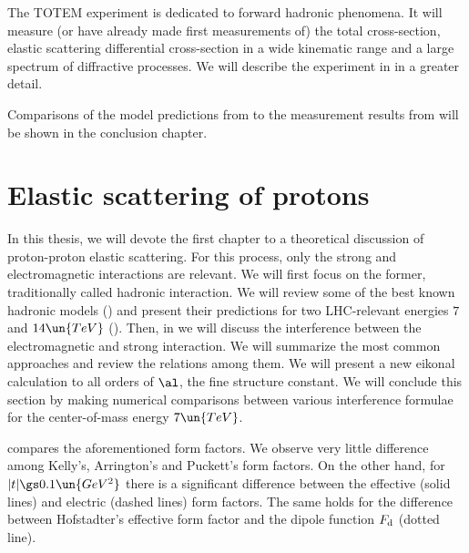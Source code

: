 The TOTEM experiment is dedicated to forward hadronic phenomena. It will measure (or have already made first measurements of) the total cross-section, elastic scattering differential cross-section in a wide kinematic range and a large spectrum of diffractive processes. We will describe the experiment in  in a greater detail.



Comparisons of the model predictions from  to the measurement results from  will be shown in the conclusion chapter.


\chapter[el]{Elastic scattering of protons}

In this thesis, we will devote the first chapter to a theoretical discussion of proton-proton elastic scattering. For this process, only the strong and electromagnetic interactions are relevant. We will first focus on the former, traditionally called hadronic interaction. We will review some of the best known hadronic models () and present their predictions for two LHC-relevant energies $7$ and $14\un{TeV}$ (). Then, in  we will discuss the interference between the electromagnetic and strong interaction. We will summarize the most common approaches and review the relations among them. We will present a new eikonal calculation to all orders of $\al$, the fine structure constant. We will conclude this section by making numerical comparisons between various interference formulae for the center-of-mass energy $7\un{TeV}$.



 compares the aforementioned form factors. We observe very little difference among Kelly's, Arrington's and Puckett's form factors. On the other hand, for $|t| \gs 0.1\un{GeV^2}$ there is a significant difference between the effective (solid lines) and electric (dashed lines) form factors. The same holds for the difference between Hofstadter's effective form factor and the dipole function $F_{\rm d}$ (dotted line).

